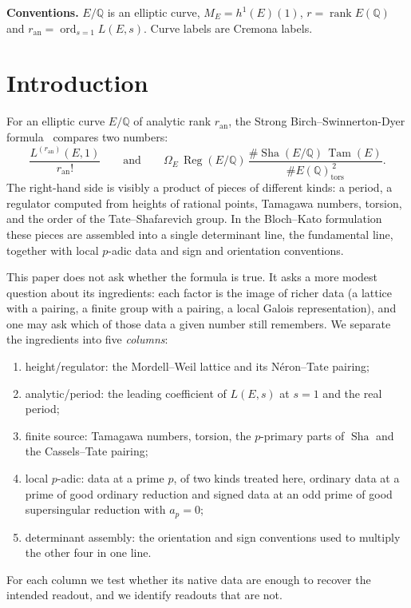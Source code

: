 \documentclass[11pt]{article}
\theoremstyle{definition}
\newcommand{\Q}{\mathbb{Q}}
\newcommand{\Sha}{\operatorname{Sha}}
\newcommand{\Reg}{\operatorname{Reg}}
\newcommand{\Tam}{\operatorname{Tam}}
\newcommand{\tors}{\operatorname{tors}}
\newcommand{\rank}{\operatorname{rank}}
\begin{document}
\medskip
\noindent
\textbf{Conventions.} $E/\Q$ is an elliptic curve, $M_E=h^1(E)(1)$,
$r=\rank E(\Q)$ and $r_{\mathrm{an}}=\operatorname{ord}_{s=1}L(E,s)$.
Curve labels are Cremona labels.

\section{Introduction}\label{sec:introduction}


For an elliptic curve $E/\Q$ of analytic rank $r_{\mathrm{an}}$, the
Strong Birch--Swinnerton-Dyer
formula~\citep{BirchSwinnertonDyer1965,Tate1966bsd} compares two numbers:
\[
  \frac{L^{(r_{\mathrm{an}})}(E,1)}{r_{\mathrm{an}}!}
  \qquad\text{and}\qquad
  \Omega_E\,\Reg(E/\Q)\,
  \frac{\#\Sha(E/\Q)\,\Tam(E)}{\#E(\Q)_{\tors}^{\,2}} .
\]
The right-hand side is visibly a product of pieces of different kinds: a
period, a regulator computed from heights of rational points, Tamagawa
numbers, torsion, and the order of the Tate--Shafarevich group.  In the
Bloch--Kato formulation~\citep{BlochKato1990,FontainePerrinRiou1994} these
pieces are assembled into a single determinant line, the fundamental
line, together with local $p$-adic data and sign and orientation
conventions.

This paper does not ask whether the formula is true.  It asks a more
modest question about its ingredients: each factor is the image of richer
data (a lattice with a pairing, a finite group with a pairing, a local
Galois representation), and one may ask which of those data a given
number still remembers.  We separate the ingredients into five
\emph{columns}:
\begin{enumerate}
\item height/regulator: the Mordell--Weil lattice and its N\'eron--Tate
  pairing;
\item analytic/period: the leading coefficient of $L(E,s)$ at $s=1$ and the
  real period;
\item finite source: Tamagawa numbers, torsion, the $p$-primary parts of
  $\Sha$ and the Cassels--Tate pairing;
\item local $p$-adic: data at a prime $p$, of two kinds treated here,
  ordinary data at a prime of good ordinary reduction and signed data at an
  odd prime of good supersingular reduction with $a_p=0$;
\item determinant assembly: the orientation and sign conventions used to
  multiply the other four in one line.
\end{enumerate}
For each column we test whether its native data are enough to recover the
intended readout, and we identify readouts that are not.
\end{document}
